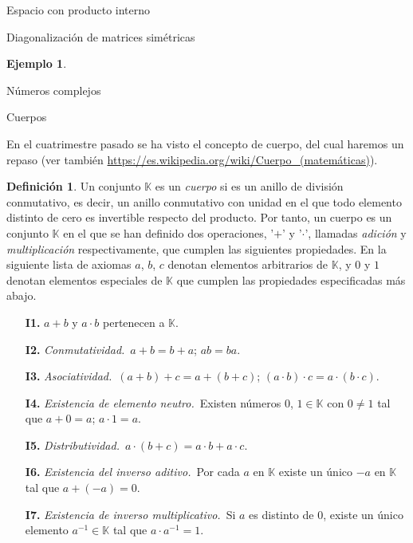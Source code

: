 \documentclass[a4paper,12pt,twoside,spanish,reqno]{amsbook}
\theoremstyle{definition}
\newtheorem{definicion}{Definici\'on}[section]
\newtheorem{ejemplo}{Ejemplo}[section]
\theoremstyle{remark}
\newcommand{\K}{\mathbb K}
\begin{document}
\begin{chapter}{Espacio con producto interno}
\begin{section}{Diagonalización de matrices simétricas}
\begin{ejemplo}
	\end{ejemplo}
	
	\end{section}

\end{chapter}



\appendix
\setcounter{chapter}{0}
\renewcommand{\thechapter}{\Alph{chapter}}

\begin{chapter}{Números complejos}\label{chap-num-compl}
	
	\begin{section}{Cuerpos}
		
		En el cuatrimestre pasado se ha visto el concepto de cuerpo, del cual haremos un repaso (ver también  \href{https://es.wikipedia.org/wiki/Cuerpo\_(matemáticas)}{https://es.wikipedia.org/wiki/Cuerpo\_(matemáticas)}).
		
		
		\begin{definicion}
			Un  conjunto $\K$ es un \textit{cuerpo} si es un anillo de división conmutativo, es decir, un anillo conmutativo con unidad en el que todo elemento distinto de cero es invertible respecto del producto. Por tanto,  un cuerpo es un conjunto $\K$ en el que se han definido dos operaciones, '$+$' y '$\cdot$', llamadas \textit{adición} y \textit{multiplicación} respectivamente, que cumplen las siguientes propiedades. En la siguiente lista de axiomas $a$, $b$, $c$ denotan elementos arbitrarios de $\K$, y $0$ y $1$ denotan elementos especiales de $\K$ que cumplen las propiedades especificadas más abajo.
			\begin{enumerate}
				\item[{\bf I1.}] $a+b$ y $a\cdot b$ pertenecen a ${\K}$.
				\item[{\bf I2.}] {\em Conmutatividad.}\, $a+b = b+a$; $ab=ba$. 
				\item[{\bf I3.}] {\em Asociatividad.}\, $(a+b)+c = a+(b+c)$;\; $(a\cdot b)\cdot c = a\cdot (b\cdot c)$. 
				\item[{\bf I4.}] {\em Existencia de elemento neutro.}\, Existen números $0$, $1 \in \K$ con $0\not=1$ tal que $a+0=a$; $a\cdot 1=a$. 
				\item[{\bf I5.}] {\em Distributividad.}\, $a\cdot (b+c)=a\cdot b+a\cdot c$. 
				\item[{\bf I6.}] {\em Existencia del inverso aditivo.}\, Por cada $a$ en ${\K}$ existe un único  $-a$ en ${\K}$ tal que $a+(-a)=0$. 
				\item[{\bf I7.}] {\em Existencia de inverso multiplicativo.}\, Si $a$ es distinto de 0, existe un único elemento $a^{-1} \in \K$  tal que $a\cdot a^{-1}=1$. 
			\end{enumerate}
		\end{definicion}
		

\end{section}
\end{chapter}
\end{document}
